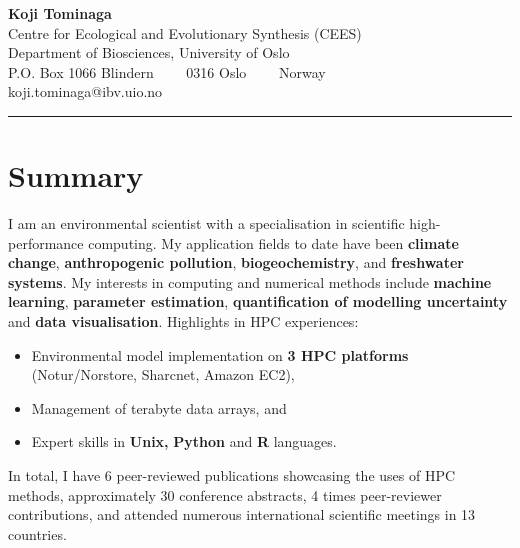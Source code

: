 \documentclass[10pt, a4paper]{article}
\begin{document}
\selectfont


\begin{center}
{\LARGE \textbf{Koji Tominaga}}
\\
Centre for Ecological and Evolutionary Synthesis (CEES)\\
Department of Biosciences, University of Oslo\\
P.O. Box 1066 Blindern\ \ \textbullet
\ \ 0316 Oslo\ \ \textbullet 
\ \ Norway
\\
koji.tominaga@ibv.uio.no
\end{center}

\hrule
\vspace{-0.4em}

\section*{Summary}
I am an environmental scientist with a specialisation in scientific high-performance computing. My application fields to date have been \textbf{climate change},
\textbf{anthropogenic pollution}, \textbf{biogeochemistry}, and \textbf{freshwater
systems}. My interests in computing and numerical methods include
\textbf{machine learning}, \textbf{parameter estimation}, \textbf{quantification of modelling
uncertainty} and \textbf{data visualisation}. Highlights in HPC experiences:
\begin{itemize}
  \itemsep-0.1em
  \item Environmental model implementation on \textbf{3 HPC platforms} (Notur/Norstore, Sharcnet, Amazon EC2),
  \item Management of terabyte data arrays, and 
  \item Expert skills in \textbf{Unix,} \textbf{Python} and \textbf{R} languages.
\end{itemize}





\nocite{couture_modelling_2014}
\nocite{tominaga_lake_2013}
\nocite{tominaga_future_2012}
\nocite{tominaga_predicting_2010}
\nocite{tominaga_voyage_2009-1}


\flushleft In total, I have 6 peer-reviewed publications showcasing the uses of HPC methods, approximately 30 conference abstracts, 4 times peer-reviewer contributions, and attended numerous international scientific meetings in 13 countries.
\end{document}
